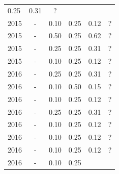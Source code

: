 \begin{table}[H]
\begin{tabular}{| l | c | c | c | c | c |}
          0.25
          &
            {\color{red} 0.31}
          &
          ?
          \\
            2015
          &
          -
          &
          0.10
          &
          0.25
          &
            {\color{red} 0.12}
          &
          ?
          \\
            2015
          &
          -
          &
          0.50
          &
          0.25
          &
            {\color{blue} 0.62}
          &
          ?
          \\
            2015
          &
          -
          &
          0.25
          &
          0.25
          &
            {\color{red} 0.31}
          &
          ?
          \\
            2015
          &
          -
          &
          0.10
          &
          0.25
          &
            {\color{red} 0.12}
          &
          ?
          \\
\hline
            2016
          &
          -
          &
          0.25
          &
          0.25
          &
            {\color{red} 0.31}
          &
          ?
          \\
            2016
          &
          -
          &
          0.10
          &
          0.50
          &
            {\color{red} 0.15}
          &
          ?
          \\
            2016
          &
          -
          &
          0.10
          &
          0.25
          &
            {\color{red} 0.12}
          &
          ?
          \\
            2016
          &
          -
          &
          0.25
          &
          0.25
          &
            {\color{red} 0.31}
          &
          ?
          \\
            2016
          &
          -
          &
          0.10
          &
          0.25
          &
            {\color{red} 0.12}
          &
          ?
          \\
            2016
          &
          -
          &
          0.10
          &
          0.25
          &
            {\color{red} 0.12}
          &
          ?
          \\
            2016
          &
          -
          &
          0.10
          &
          0.25
          &
            {\color{red} 0.12}
          &
          ?
          \\
            2016
          &
          -
          &
          0.10
          &
          0.25

\end{tabular}
\end{table}
